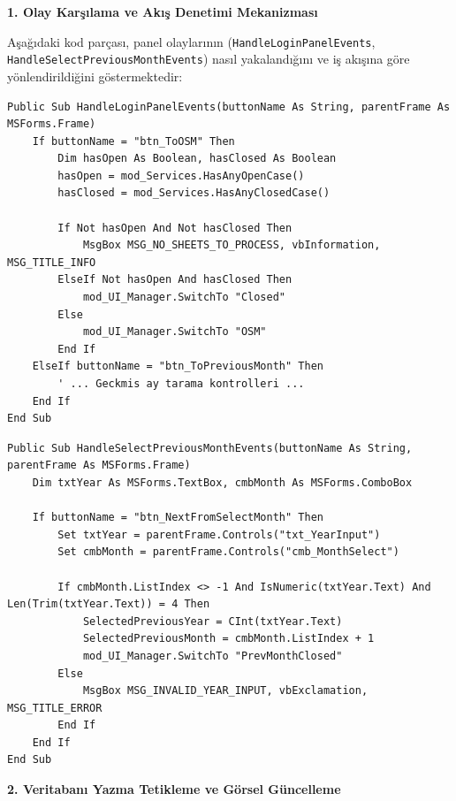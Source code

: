 \vspace{0.15cm}

\textbf{\textcolor{primary}{1. Olay Karşılama ve Akış Denetimi Mekanizması}}

Aşağıdaki kod parçası, panel olaylarının (\texttt{HandleLoginPanelEvents}, \texttt{HandleSelectPreviousMonthEvents}) nasıl yakalandığını ve iş akışına göre yönlendirildiğini göstermektedir:

\begin{lstlisting}[caption={Panel Geçiş ve Akış Kontrol Mantığı}]
Public Sub HandleLoginPanelEvents(buttonName As String, parentFrame As MSForms.Frame)
    If buttonName = "btn_ToOSM" Then
        Dim hasOpen As Boolean, hasClosed As Boolean
        hasOpen = mod_Services.HasAnyOpenCase()
        hasClosed = mod_Services.HasAnyClosedCase()
        
        If Not hasOpen And Not hasClosed Then
            MsgBox MSG_NO_SHEETS_TO_PROCESS, vbInformation, MSG_TITLE_INFO
        ElseIf Not hasOpen And hasClosed Then
            mod_UI_Manager.SwitchTo "Closed"
        Else
            mod_UI_Manager.SwitchTo "OSM"
        End If
    ElseIf buttonName = "btn_ToPreviousMonth" Then
        ' ... Geckmis ay tarama kontrolleri ...
    End If
End Sub
\end{lstlisting}

\newpage

\begin{lstlisting}[caption={Girdi Doğrulama ve İkincil Akış Yönetimi}]
Public Sub HandleSelectPreviousMonthEvents(buttonName As String, parentFrame As MSForms.Frame)
    Dim txtYear As MSForms.TextBox, cmbMonth As MSForms.ComboBox
    
    If buttonName = "btn_NextFromSelectMonth" Then
        Set txtYear = parentFrame.Controls("txt_YearInput")
        Set cmbMonth = parentFrame.Controls("cmb_MonthSelect")
        
        If cmbMonth.ListIndex <> -1 And IsNumeric(txtYear.Text) And Len(Trim(txtYear.Text)) = 4 Then
            SelectedPreviousYear = CInt(txtYear.Text)
            SelectedPreviousMonth = cmbMonth.ListIndex + 1
            mod_UI_Manager.SwitchTo "PrevMonthClosed"
        Else
            MsgBox MSG_INVALID_YEAR_INPUT, vbExclamation, MSG_TITLE_ERROR
        End If
    End If
End Sub
\end{lstlisting}

\vspace{0.3cm}

\textbf{\textcolor{primary}{2. Veritabanı Yazma Tetikleme ve Görsel Güncelleme}}

